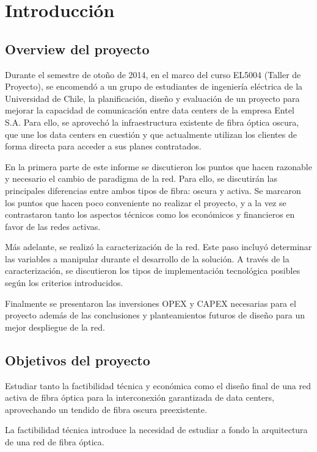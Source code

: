 
\section{Introducci\'on}
\label{sec:intro}

\subsection{Overview del proyecto}
\label{sec:overview}

Durante el semestre de otoño de 2014, en el marco del curso EL5004
(Taller de Proyecto), se encomendó a un grupo de estudiantes de
ingeniería eléctrica de la Universidad de Chile, la planificación,
diseño y evaluación de un proyecto para mejorar la capacidad de
comunicación entre data centers de la empresa Entel S.A. Para ello,
se aprovechó la infraestructura existente de fibra óptica oscura,
que une los data centers en cuestión y que actualmente utilizan los
clientes de forma directa para acceder a sus planes contratados.

En la primera parte de este informe se discutieron los puntos que
hacen razonable y necesario el cambio de paradigma de la red. Para
ello, se discutirán las principales diferencias entre ambos tipos de
fibra: oscura y activa. Se marcaron los puntos que hacen poco
conveniente no realizar el proyecto, y a la vez se contrastaron tanto
los aspectos técnicos como los económicos y financieros en favor de
las redes activas.

Más adelante, se realizó la caracterización de la red. Este paso
incluyó determinar las variables a manipular durante el desarrollo de
la solución. A través de la caracterización, se discutieron los tipos
de implementación tecnológica posibles según los criterios
introducidos.

Finalmente se presentaron las inversiones OPEX y CAPEX necesarias
para el proyecto además de las conclusiones y planteamientos futuros
de diseño para un mejor despliegue de la red.

\subsection{Objetivos del proyecto}
\label{sec:objetivos}

Estudiar tanto la factibilidad técnica y económica como el diseño
final de una red activa de fibra óptica para la interconexión
garantizada de data centers, aprovechando un tendido de fibra oscura
preexistente.

La factibilidad técnica introduce la necesidad de estudiar a fondo la
arquitectura de una red de fibra óptica.

